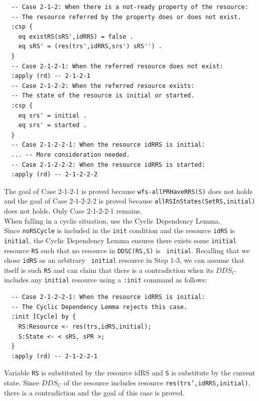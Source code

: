 \documentclass[12pt]{report}
\newcommand{\stt}[1]{{\small{\tt {#1}}}}
\begin{document}
\small
\begin{verbatim}
  -- Case 2-1-2: When there is a not-ready property of the resource:
  -- The resource referred by the property does or does not exist.
  :csp {
    eq existRS(sRS',idRRS) = false .
    eq sRS' = (res(trs',idRRS,srs') sRS'') .
  }
  -- Case 2-1-2-1: When the referred resource does not exist:
  :apply (rd) -- 2-1-2-1
  -- Case 2-1-2-2: When the referred resource exists:
  -- The state of the resource is initial or started.
  :csp { 
    eq srs' = initial .
    eq srs' = started .
  }
  -- Case 2-1-2-2-1: When the resource idRRS is initial:
  ... -- More consideration needed.
  -- Case 2-1-2-2-2: When the resource idRRS is started:
  :apply (rd) -- 2-1-2-2-2
\end{verbatim}
\normalsize
The goal of Case 2-1-2-1 is proved because \stt{wfs-allPRHaveRRS(S)}
does not holds and the goal of Case 2-1-2-2-2 is proved because
\stt{allRSInStates(SetRS,initial)} does not holds.  Only Case
2-1-2-2-1 remains.\\

 When falling in a cyclic situation, use the
Cyclic Dependency Lemma. \\ Since {\tt noRSCycle} is included in the
{\tt init} condition and the resource {\tt idRS} is {\tt initial}, the
Cyclic Dependency Lemma ensures there exists some {\tt initial}
resource {\tt RS} such that no resource in \stt{DDSC(RS,S)} is {\tt
  initial}. Recalling that we chose {\tt idRS} as an arbitrary {\tt
  initial} resource in Step 1-3, we can assume that itself is such
{\tt RS} and can claim that there is a contradiction when its $DDS_C$ includes
any {\tt initial} resource using a {\tt :init} command as follows:
\small
\begin{verbatim}
  -- Case 2-1-2-2-1: When the resource idRRS is initial:
  -- The Cyclic Dependency Lemma rejects this case.
  :init [Cycle] by {
    RS:Resource <- res(trs,idRS,initial);
    S:State <- < sRS, sPR >;
  }
  :apply (rd) -- 2-1-2-2-1
\end{verbatim}
\normalsize
Variable {\tt RS} is substituted by the resource idRS and {\tt S} is
substitute by the current state. Since $DDS_C$ of the resource
includes resource \stt{res(trs',idRRS,initial)}, there is a
contradiction and the goal of this case is proved.
\end{document}
